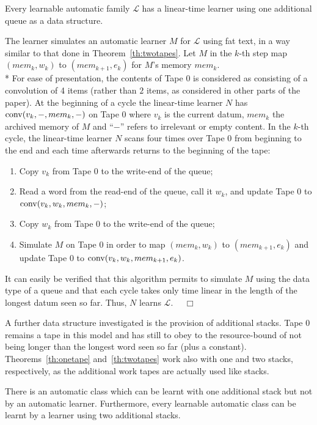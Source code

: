 \documentclass{LMCS}
\newcommand{\CalL}{{\mathcal L}}
\theoremstyle{plain}\newtheorem{athm}[thm]{Theorem}
\theoremstyle{plain}\newtheorem{aprop}[thm]{Proposition}
\theoremstyle{plain}\newtheorem{aprob}[thm]{Open Problem}
\theoremstyle{plain}\newtheorem{acor}[thm]{Corollary}
\theoremstyle{plain}\newtheorem{alem}[thm]{Lemma}
\theoremstyle{definition}\newtheorem{adefn}[thm]{Definition}
\theoremstyle{definition}\newtheorem{arem}[thm]{Remark}
\theoremstyle{plain}\newtheorem{aexmp}[thm]{Example}
\theoremstyle{plain}\newtheorem{aclm}[thm]{Claim}
\def\niceqed{~~$\Box$}
\def\conv{{\rm{conv}}}
\def\sp{\\*\indent}
\begin{document}
\begin{thm} \label{th:queue}
Every learnable automatic family $\CalL$ has a linear-time learner using
one additional queue as a data structure.
\end{thm}

\proof
The learner simulates an automatic learner $M$ for $\CalL$
using fat text, in a way similar
to that done in Theorem~\ref{th:twotapes}. Let $M$ in the $k$-th step map
$(mem_k,w_k)$ to $(mem_{k+1},e_k)$ for $M$'s memory $mem_k$. 
\sp
For ease of presentation, the contents of Tape $0$ is considered as
consisting of a convolution of 4 items (rather than $2$ items,
as considered in other parts of the paper).
At the beginning of a cycle the linear-time learner $N$ has 
$\conv(v_k,-,mem_k,-)$ on Tape $0$
where $v_k$ is the current datum, $mem_k$ the archived memory of $M$ and
``$-$'' refers to irrelevant or empty content. In the $k$-th cycle,
the linear-time learner $N$ 
scans four times over Tape $0$ from beginning to the end
and each time afterwards returns to the beginning of the tape:
\begin{enumerate}[(1)]
\item Copy $v_k$ from Tape $0$ to the write-end of the queue;
\item Read a word from the read-end of the queue, call it $w_k$,
      and update Tape $0$ to $\conv(v_k,w_k,\linebreak[3] mem_k,-)$;
\item Copy $w_k$ from Tape $0$ to the write-end of the queue;
\item Simulate $M$ on Tape $0$ in order to map $(mem_k,w_k)$ to
      $(mem_{k+1},e_k)$ and update Tape $0$ to $\conv(v_k,w_k,mem_{k+1},e_k)$.
\end{enumerate}
It can easily be verified that this algorithm permits to simulate $M$
using the data type of a queue and that each cycle takes only time
linear in the length of the longest datum seen so far.
Thus, $N$ learns $\CalL$. \niceqed

\medskip
\noindent
A further data structure investigated is the provision of
additional stacks. Tape $0$ remains a tape in this model and has
still to obey to the resource-bound of not being longer than the longest
word seen so far (plus a constant). Theorems~\ref{th:onetape}
and~\ref{th:twotapes} work
also with one and two stacks, respectively, as the additional work tapes
are actually used like stacks.

\begin{thm}
There is an automatic class which can be learnt
with one additional stack but not by an automatic learner. Furthermore,
every learnable automatic class can be learnt by a learner
using two additional stacks.
\end{thm}
\end{document}
